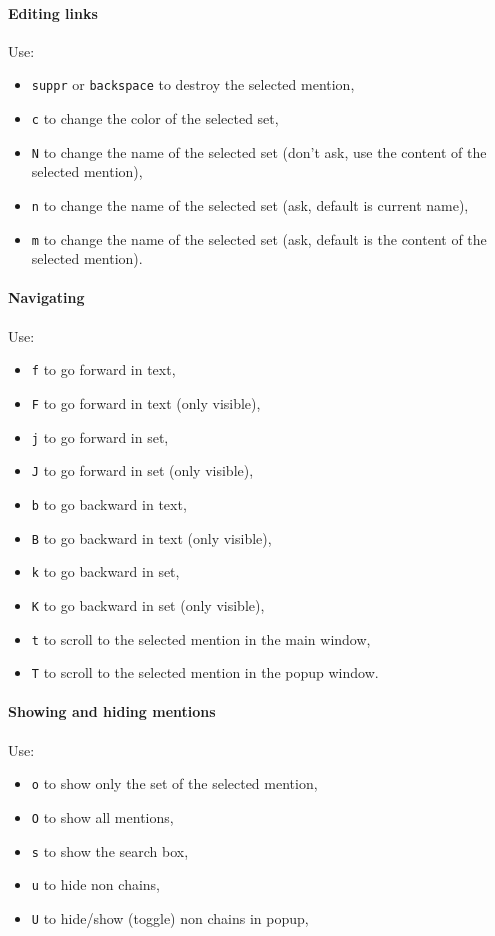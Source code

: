 \documentclass[12pt]{article}
\begin{document}
\paragraph{Editing links} Use:
\begin{itemize}
   \item \verb|suppr| or \verb|backspace| to destroy the selected mention,
   \item \verb|c| to change the color of the selected set,
   \item \verb|N| to change the name of the selected set (don't ask, use
   the content of the selected mention),
   \item \verb|n| to change the name of the selected set (ask, default is
   current name),
   \item \verb|m| to change the name of the selected set (ask, default is
   the content of the selected mention).
\end{itemize}

\paragraph{Navigating} Use:
\begin{itemize}
   \item \verb|f| to go forward in text,
   \item \verb|F| to go forward in text (only visible),
   \item \verb|j| to go forward in set,
   \item \verb|J| to go forward in set (only visible),
   \item \verb|b| to go backward in text,
   \item \verb|B| to go backward in text (only visible),
   \item \verb|k| to go backward in set,
   \item \verb|K| to go backward in set (only visible),
   \item \verb|t| to scroll to the selected mention in the main window,
   \item \verb|T| to scroll to the selected mention in the popup window.
\end{itemize}

\paragraph{Showing and hiding mentions} Use:
\begin{itemize}
   \item \verb|o| to show only the set of the selected mention,
   \item \verb|O| to show all mentions,
   \item \verb|s| to show the search box,
   \item \verb|u| to hide non chains,
   \item \verb|U| to hide/show (toggle) non chains in popup,
\end{itemize}
\end{document}
